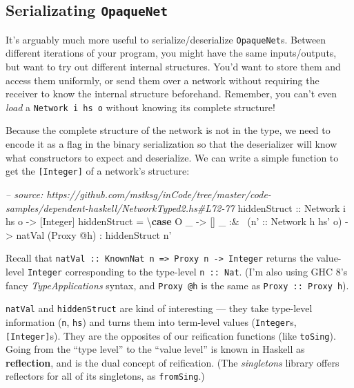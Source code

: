 \documentclass[]{article}
\newenvironment{Shaded}{}{}
\newcommand{\KeywordTok}[1]{\textcolor[rgb]{0.00,0.44,0.13}{\textbf{{#1}}}}
\newcommand{\DataTypeTok}[1]{\textcolor[rgb]{0.56,0.13,0.00}{{#1}}}
\newcommand{\CommentTok}[1]{\textcolor[rgb]{0.38,0.63,0.69}{\textit{{#1}}}}
\newcommand{\OtherTok}[1]{\textcolor[rgb]{0.00,0.44,0.13}{{#1}}}
\newcommand{\FunctionTok}[1]{\textcolor[rgb]{0.02,0.16,0.49}{{#1}}}
\newcommand{\NormalTok}[1]{{#1}}
\begin{document}
\subsection{\texorpdfstring{Serializating
\texttt{OpaqueNet}}{Serializating OpaqueNet}}\label{serializating-opaquenet}

It's arguably much more useful to serialize/deserialize \texttt{OpaqueNet}s.
Between different iterations of your program, you might have the same
inputs/outputs, but want to try out different internal structures. You'd want to
store them and access them uniformly, or send them over a network without
requiring the receiver to know the internal structure beforehand. Remember, you
can't even \emph{load} a \texttt{Network\ i\ hs\ o} without knowing its complete
structure!

Because the complete structure of the network is not in the type, we need to
encode it as a flag in the binary serialization so that the deserializer will
know what constructors to expect and deserialize. We can write a simple function
to get the \texttt{{[}Integer{]}} of a network's structure:

\begin{Shaded}
\begin{Highlighting}[]
\CommentTok{-- source: https://github.com/mstksg/inCode/tree/master/code-samples/dependent-haskell/NetworkTyped2.hs#L72-77}
\OtherTok{hiddenStruct ::} \DataTypeTok{Network} \NormalTok{i hs o }\OtherTok{->} \NormalTok{[}\DataTypeTok{Integer}\NormalTok{]}
\NormalTok{hiddenStruct }\FunctionTok{=} \NormalTok{\textbackslash{}}\KeywordTok{case}
    \DataTypeTok{O} \NormalTok{_    }\OtherTok{->} \NormalTok{[]}
    \NormalTok{_ }\FunctionTok{:&~} \NormalTok{(}\OtherTok{n' ::} \DataTypeTok{Network} \NormalTok{h hs' o)}
           \OtherTok{->} \NormalTok{natVal (}\DataTypeTok{Proxy} \FunctionTok{@}\NormalTok{h)}
            \FunctionTok{:} \NormalTok{hiddenStruct n'}
\end{Highlighting}
\end{Shaded}

Recall that
\texttt{natVal\ ::\ KnownNat\ n\ =\textgreater{}\ Proxy\ n\ -\textgreater{}\ Integer}
returns the value-level \texttt{Integer} corresponding to the type-level
\texttt{n\ ::\ Nat}. (I'm also using GHC 8's fancy \emph{TypeApplications}
syntax, and \texttt{Proxy\ @h} is the same as \texttt{Proxy\ ::\ Proxy\ h}).

\texttt{natVal} and \texttt{hiddenStruct} are kind of interesting --- they take
type-level information (\texttt{n}, \texttt{hs}) and turns them into term-level
values (\texttt{Integer}s, \texttt{{[}Integer{]}}s). They are the opposites of
our reification functions (like \texttt{toSing}). Going from the ``type level''
to the ``value level'' is known in Haskell as \textbf{reflection}, and is the
dual concept of reification. (The \emph{singletons} library offers reflectors
for all of its singletons, as \texttt{fromSing}.)
\end{document}
